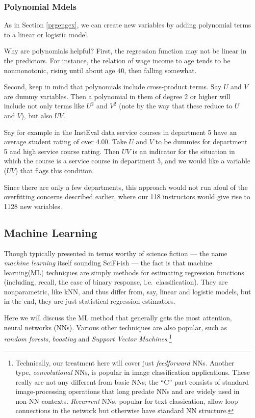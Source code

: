 \subsubsection{Polynomial Mdels}

As in Section \ref{prgengex}, we can create new variables by adding
polynomial terms to a linear or logistic model.

Why are polynomials helpful?  First, the regression function may not be
linear in the predictors.  For instance, the relation of wage income to
age tends to be nonmonotonic, rising until about age 40, then falling
somewhat.

Second, keep in mind that polynomials include cross-product terms.  Say
$U$ and $V$ are dummy variables.  Then a polynomial in them of degree 2
or higher will include not only terms like $U^2$ and $V^2$ (note by the
way that these reduce to $U$ and $V$), but also $UV$.

Say for example in the InstEval data service courses in department 5
have an average student rating of over 4.00.  Take $U$ and $V$ to be
dummies for department 5 and high service course rating.  Then $UV$ is
an indicator for the situation in which the course is a service course
in department 5, and we would like a variable ($UV$) that flags this
condition.

Since there are only a few departments, this approach would not run
afoul of the overfitting concerns described earlier, where our 118
instructors would give rise to 1128 new variables.

\subsection{Machine Learning}

Though typically presented in terms worthy of science fiction --- the
name \textit{machine learning} itself sounding SciFi-ish --- the fact is
that machine learning(ML) techniques are simply methods for estimating
regression functions (including, recall, the case of binary response,
i.e.\ classification).  They are nonparametric, like kNN, and thus differ
from, say, linear and logistic models, but in the end, they are just
statistical regression estimators.

Here we will discuss the ML method that generally gets the most
attention, neural networks (NNs).  Various other techniques are also
popular, such as \textit{random forests}, \textit{boosting} and
\textit{Support Vector Machines}.\footnote{Technically, our treatment
here will cover just \textit{feedforward} NNs.  Another type,
\textit{convolutional} NNs, is popular in image classification
applications.  These really are not any different from basic NNs; the
``C'' part consists of standard image-processing operations that long
predate NNs and are widely used in non-NN contexts.  \textit{Recurrent}
NNs, popular for text classication, allow loop connections in the
network but otherwise have standard NN structure.}

